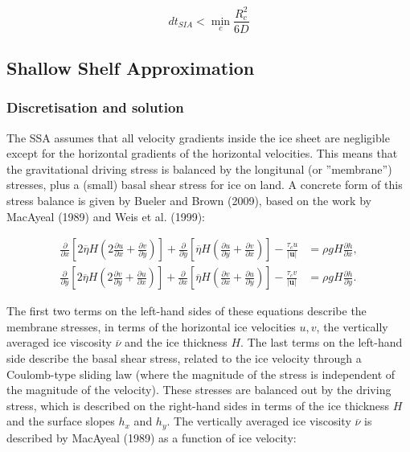 \documentclass{article}
\begin{document}
\begin{equation} \label{eq:SIA_dt}
dt_{SIA} < \min_c \frac{R_c^2}{6D}
\end{equation}

\subsection{Shallow Shelf Approximation}

\subsubsection{Discretisation and solution}

The SSA assumes that all velocity gradients inside the ice sheet are negligible except for the horizontal gradients of the horizontal velocities. This means that the gravitational driving stress is balanced by the longitunal (or ''membrane'') stresses, plus a (small) basal shear stress for ice on land. A concrete form of this stress balance is given by Bueler and Brown (2009), based on the work by MacAyeal (1989) and Weis et al. (1999):

\begin{align} \label{eq:SSA}
\frac{\partial}{\partial x} \left[ 2 \overline{\eta} H \left( 2 \frac{\partial u}{\partial x} + \frac{\partial v}{\partial y} \right) \right] +
\frac{\partial}{\partial y} \left[    \overline{\eta} H \left(    \frac{\partial u}{\partial y} + \frac{\partial v}{\partial x} \right) \right] -
\frac{\tau_c u}{|\textbf{u}|} &= \rho g H \frac{\partial h}{\partial x}, \\
\frac{\partial}{\partial y} \left[ 2 \overline{\eta} H \left( 2 \frac{\partial v}{\partial y} + \frac{\partial u}{\partial x} \right) \right] +
\frac{\partial}{\partial x} \left[    \overline{\eta} H \left(    \frac{\partial v}{\partial x} + \frac{\partial u}{\partial y} \right) \right] -
\frac{\tau_c v}{|\textbf{u}|} &= \rho g H \frac{\partial h}{\partial y}.
\end{align}

The first two terms on the left-hand sides of these equations describe the membrane stresses, in terms of the horizontal ice velocities $u,v$, the vertically averaged ice viscosity $\overline{\nu}$ and the ice thickness $H$. The last terms on the left-hand side describe the basal shear stress, related to the ice velocity through a Coulomb-type sliding law (where the magnitude of the stress is independent of the magnitude of the velocity). These stresses are balanced out by the driving stress, which is described on the right-hand sides in terms of the ice thickness $H$ and the surface slopes $h_x$ and $h_y$. The vertically averaged ice viscosity $\overline{\nu}$ is described by MacAyeal (1989) as a function of ice velocity:
\end{document}
